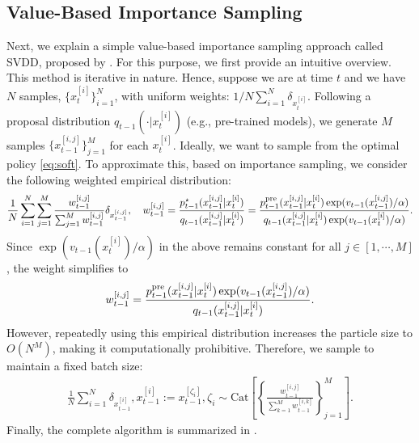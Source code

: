 \subsection{Value-Based Importance Sampling}\label{sec:SVDD}

Next, we explain a simple value-based importance sampling approach called SVDD, proposed by \citet{li2024derivative}. For this purpose, we first provide an intuitive overview. This method is iterative in nature. Hence, suppose we are at time $t$ and we have $N$ samples, $\{x^{[i]}_{t}\}_{i=1}^N$, with uniform weights: $1/N\sum_{i=1}^N \delta_{x^{[i]}_{t}}. $
Following a proposal distribution $q_{t-1}(\cdot | x^{[i]}_{t})$ (e.g., pre-trained models), we generate $M$ samples $\{ x^{[i,j]}_{t-1}\}_{j=1}^M$ for each $x^{[i]}_{t}$. Ideally, we want to sample from the optimal policy \eqref{eq:soft}. To approximate this, based on importance sampling, we consider the following weighted empirical distribution: 
\begin{align*}
     \frac{1}{N}\sum_{i=1}^N \sum_{j=1}^M \frac{w^{[i,j]}_{t-1}  }{\sum_{j=1}^M w^{[i,j]}_{t-1}}\delta_{ x^{[i,j]}_{t-1}}, \quad w^{[i,j]}_{t-1} = \frac{p^{\star}_{t-1}(x^{[i,j]}_{t-1}|x^{[i]}_{t} ) }{q_{t-1}(x^{[i,j]}_{t-1}|x^{[i]}_{t} )} =  \frac{ p^{\mathrm{pre}}_{t-1}(x^{[i,j]}_{t-1}|x^{[i]}_{t} )\exp(v_{t-1}(x^{[i,j]}_{t-1})/\alpha) }{q_{t-1}(x^{[i,j]}_{t-1}|x^{[i]}_{t} ) \exp(v_{t-1}(x^{[i]}_{t})/\alpha )   }. 
\end{align*}
Since $\exp(v_{t-1}(x^{[i]}_{t})/\alpha )$ in the above remains constant for all $j \in [1,\cdots,M]$, the weight simplifies to
\begin{align}\label{eq:correct_weight}
    w^{[i,j]}_{t-1} = \frac{ p^{\mathrm{pre}}_{t-1}(x^{[i,j]}_{t-1}|x^{[i]}_{t} )\exp(v_{t-1}(x^{[i,j]}_{t-1})/\alpha) }{q_{t-1}(x^{[i,j]}_{t-1}|x^{[i]}_{t} ) }. 
\end{align}
However, repeatedly using this empirical distribution increases the particle size to $O(N^M)$, making it computationally prohibitive. Therefore, we sample to maintain a fixed batch size:
\begin{align*}
    \frac{1}{N} \sum_{i=1}^N \delta_{x^{[i]}_{t-1}}, x^{[i]}_{t-1}:=  x^{[\zeta_i]}_{t-1}, \zeta_i \sim \mathrm{Cat}\left [\left\{   \frac{w^{[i,j]}_{t-1}  }{\sum_{k=1}^M w^{[i,k]}_{t-1}} \right\}_{j=1}^M \right ]. 
\end{align*}
Finally, the complete algorithm is summarized in . 


